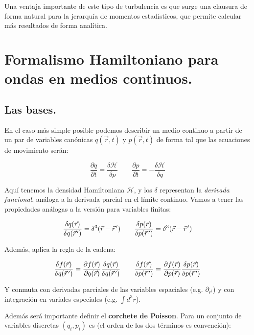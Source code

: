 Una ventaja importante de este tipo de turbulencia es que surge una clausura de forma natural para la jerarquía de momentos estadísticos, que permite calcular más resultados de forma analítica.

\section{Formalismo Hamiltoniano para ondas en medios continuos.}
\subsection*{Las bases.}
En el caso más simple posible podemos describir un medio continuo a partir de un par de variables canónicas $q(\vec r, t)$ y $p(\vec r, t)$ de forma tal que las ecuaciones de movimiento serán:

\begin{equation}
	\frac{\partial q}{\partial t} = \frac{\delta \mathcal{H}}{\delta p} \qquad \frac{\partial p}{\partial t} = -\frac{\delta \mathcal{H}}{\delta q}
	\label{eq:Hamilton_continuum}
\end{equation}

Aquí tenemos la densidad Hamiltoniana $\mathcal{H}$, y los $\delta$ representan la \textit{derivada funcional}, análoga a la derivada parcial en el límite continuo. Vamos a tener las propiedades análogas a la versión para variables finitas:

\begin{equation}
	\frac{\delta q(\vec r)}{\delta q(\pvec r')} = \delta^3(\vec r - \pvec r') \qquad \frac{\delta p(\vec r)}{\delta p(\pvec r')} = \delta^3(\vec r - \pvec r')
\end{equation}

Además, aplica la regla de la cadena:

\begin{equation}
	\frac{\delta f(\vec r)}{\delta q(\pvec r')} = \frac{\partial f(\vec r)}{\partial q(\vec r)} \frac{\delta q(\vec r)}{\delta q(\pvec r')} \qquad \frac{\delta f(\vec r)}{\delta p(\pvec r')} = \frac{\partial f(\vec r)}{\partial p(\vec r)} \frac{\delta p(\vec r)}{\delta p(\pvec r')}
\end{equation}

Y conmuta con derivadas parciales de las variables espaciales (e.g. $\partial_{r^i}$) y con integración en variales especiales (e.g. $\int d^3r$).


Además será importante definir el \textbf{corchete de Poisson}. Para un conjunto de variables discretas $(q_i,p_i)$ es (el orden de los dos términos es convención):

